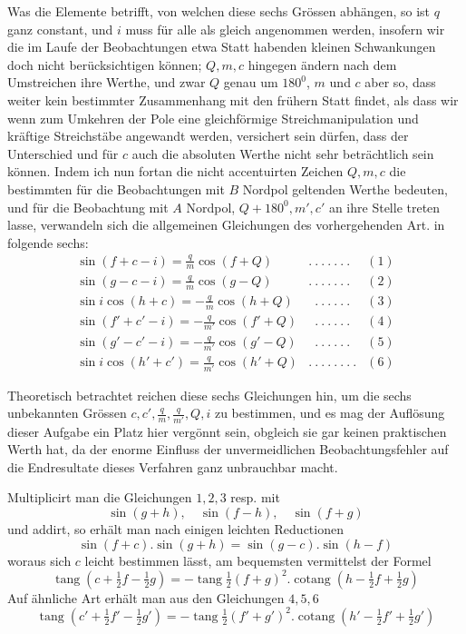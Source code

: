 Was die Elemente betrifft, von welchen diese sechs Grössen abhängen, so ist $q$ ganz constant, und $i$ muss für alle als gleich angenommen werden, insofern wir die im Laufe der Beobachtungen etwa Statt habenden kleinen Schwankungen doch nicht berücksichtigen können; $Q,m,c$ hingegen ändern nach dem Umstreichen ihre Werthe, und zwar $Q$ genau um $180^0$, $m$ und $c$ aber so, dass weiter kein bestimmter Zusammenhang mit den frühern Statt findet, als dass wir wenn zum Umkehren der Pole eine gleichförmige Streichmanipulation und kräftige Streichstäbe angewandt werden, versichert sein dürfen, dass der Unterschied und für $c$ auch die absoluten Werthe nicht sehr beträchtlich sein können. Indem ich nun fortan die nicht accentuirten Zeichen $Q,m,c$ die bestimmten für die Beobachtungen mit $B$ Nordpol geltenden Werthe bedeuten, und für die Beobachtung mit $A$ Nordpol, $Q+180^0,m',c'$ an ihre Stelle treten lasse, verwandeln sich die allgemeinen Gleichungen des vorhergehenden Art. in folgende sechs:
\[
\begin{array}{lll}
\sin(f+c-i)=\frac{q}{m}\cos(f+Q)&.\ .\ .\ .\ .\ .\ .&(1)\\[4pt]
\sin(g-c-i)=\frac{q}{m}\cos(g-Q)&.\ .\ .\ .\ .\ .\ .&(2)\\[4pt]
\sin i\cos(h+c)=-\frac{q}{m}\cos(h+Q)&\phantom{.}\ .\ .\ .\ .\ .\ .&(3)\\[4pt]
\sin(f'+c'-i)=-\frac{q}{m'}\cos(f'+Q)&\phantom{.}\ .\ .\ .\ .\ .\ .&(4)\\[4pt]
\sin(g'-c'-i)=-\frac{q}{m'}\cos(g'-Q)&\phantom{.}\ .\ .\ .\ .\ .\ .&(5)\\[4pt]
\sin i\cos(h'+c')=\frac{q}{m'}\cos(h'+Q)&.\ .\ .\ .\ .\ .\ .\ .&(6)
\end{array}
\]

Theoretisch betrachtet reichen diese sechs Gleichungen hin, um die sechs unbekannten Grössen $c,c',\frac{q}{m},\frac{q}{m'},Q,i$ zu bestimmen, und es mag der Auflösung dieser Aufgabe ein Platz hier vergönnt sein, obgleich sie gar keinen praktischen Werth hat, da der enorme Einfluss der unvermeidlichen Beobachtungsfehler auf die Endresultate dieses Verfahren ganz unbrauchbar macht.

Multiplicirt man die Gleichungen $1,2,3$ resp. mit
\[
\sin(g+h),\quad\sin(f-h),\quad\sin(f+g)
\]
und addirt, so erhält man nach einigen leichten Reductionen
\[
\sin(f+c).\sin(g+h)=\sin(g-c).\sin(h-f)
\]
woraus sich $c$ leicht bestimmen lässt, am bequemsten vermittelst der Formel
\[
\operatorname{tang}(c+\tfrac{1}{2}f-\tfrac{1}{2}g)=-\operatorname{tang}\tfrac{1}{2}(f+g)^2.\operatorname{cotang}(h-\tfrac{1}{2}f+\tfrac{1}{2}g)
\]
Auf ähnliche Art erhält man aus den Gleichungen $4,5,6$
\[
\operatorname{tang}(c'+\tfrac{1}{2}f'-\tfrac{1}{2}g')=-\operatorname{tang}\tfrac{1}{2}(f'+g')^2.\operatorname{cotang}(h'-\tfrac{1}{2}f'+\tfrac{1}{2}g')
\]
